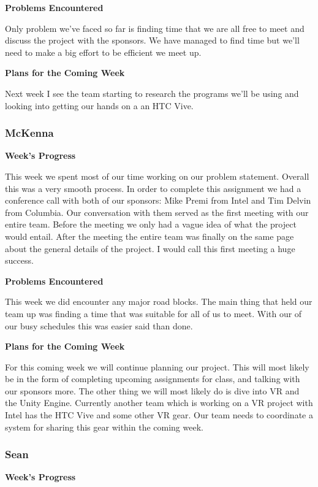 \documentclass[10pt,journal,compsoc,onecolumn, draftclsnofoot]{IEEEtran}
\begin{document}
\noindent \textbf{Problems Encountered}

Only problem we've faced so far is finding time that we are all free to meet and discuss the project with the sponsors. We have managed to find time but we'll need to make a big effort to be efficient we meet up.

\noindent \textbf{Plans for the Coming Week}

Next week I see the team starting to research the programs we'll be using and looking into getting our hands on a an HTC Vive.

\subsubsection{McKenna}
\noindent \textbf{Week's Progress}

This week we spent most of our time working on our problem statement. Overall this was a very smooth process. In order to complete this assignment we had a conference call with both of our sponsors: Mike Premi from Intel and Tim Delvin from Columbia. Our conversation with them served as the first meeting with our entire team. Before the meeting we only had a vague idea of what the project would entail. After the meeting the entire team was finally on the same page about the general details of the project. I would call this first meeting a huge success.

\noindent \textbf{Problems Encountered}

This week we did encounter any major road blocks. The main thing that held our team up was finding a time that was suitable for all of us to meet. With our of our busy schedules this was easier said than done.

\noindent \textbf{Plans for the Coming Week}

For this coming week we will continue planning our project. This will most likely be in the form of completing upcoming assignments for class, and talking with our sponsors more. The other thing we will most likely do is dive into VR and the Unity Engine. Currently another team which is working on a VR project with Intel has the HTC Vive and some other VR gear. Our team needs to coordinate a system for sharing this gear within the coming week.

\subsubsection{Sean}
\noindent \textbf{Week's Progress}
\end{document}
